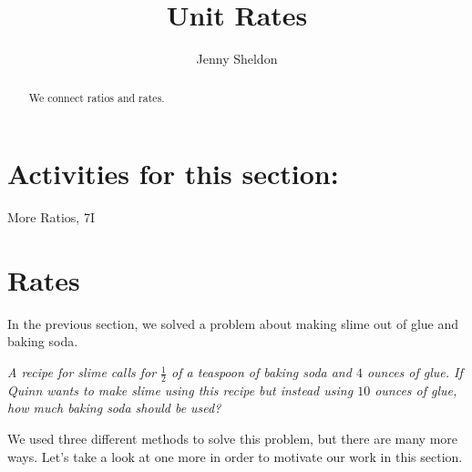 \documentclass{ximera}
\title{Unit Rates}
\author{Jenny Sheldon}
\begin{document}
\begin{abstract}
We connect ratios and rates.
\end{abstract}
\maketitle

\section{Activities for this section:} More Ratios, 7I

\section{Rates}

In the previous section, we solved a problem about making slime out of glue and baking soda.

\emph{A recipe for slime calls for $\frac{1}{2}$ of a teaspoon of baking soda and $4$ ounces of glue. If Quinn wants to make slime using this recipe but instead using $10$ ounces of glue, how much baking soda should be used?}

We used three different methods to solve this problem, but there are many more ways. Let's take a look at one more in order to motivate our work in this section.
\end{document}
